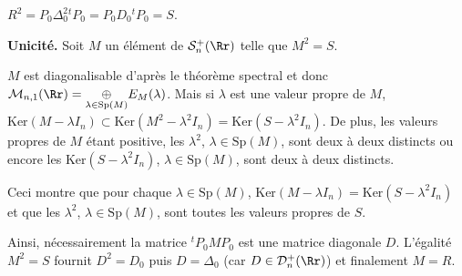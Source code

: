 {\begin{enumerate}
{\begin{center}
$R^2 = P_0\Delta_0^2{^t}P_0 = P_0D_0{^t}P_0 = S$.
\end{center}

\textbf{Unicité.} Soit $M$ un élément de $\mathcal{S}_n^+(\Rr)$ telle que $M^2 = S$.

$M$ est diagonalisable d'après le théorème spectral et donc $\mathcal{M}_{n,1}(\Rr)=\underset{\lambda\in\text{Sp}(M)}{\oplus}E_M(\lambda)$. Mais si $\lambda$ est une valeur propre de $M$, $\text{Ker}(M-\lambda I_n)\subset\text{Ker}(M^2-\lambda^2I_n)=\text{Ker}(S-\lambda^2I_n)$. De plus, les valeurs propres de $M$ étant positive, les $\lambda^2$, $\lambda\in\text{Sp}(M)$, sont deux à deux distincts ou encore les $\text{Ker}(S-\lambda^2I_n)$, $\lambda\in\text{Sp}(M)$, sont deux à deux distincts.

Ceci montre que pour chaque $\lambda\in\text{Sp}(M)$, $\text{Ker}(M-\lambda I_n)=\text{Ker}(S-\lambda^2I_n)$ et que les $\lambda^2$, $\lambda\in\text{Sp}(M)$, sont toutes les valeurs propres de $S$.

Ainsi, nécessairement la matrice ${^t}P_0MP_0$ est une matrice diagonale $D$. L'égalité $M^2=S$ fournit $D^2=D_0$ puis $D=\Delta_0$ (car $D\in\mathcal{D}_n^+(\Rr)$) et finalement $M = R$.

\begin{center}
\end{center}}
\end{enumerate}
}